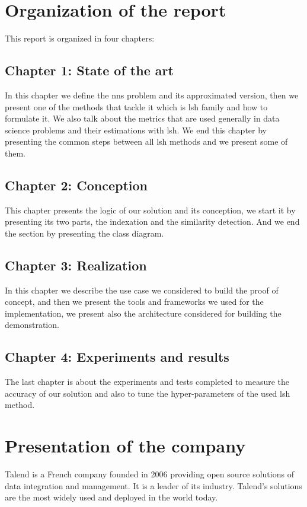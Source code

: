 \section*{Organization of the report}

This report is organized in four chapters:

\subsection*{Chapter 1: State of the art}
In this chapter we define the \acrfull{nns} problem and its approximated
version, then we present one of the methods that tackle it which is
\acrfull{lsh} family and how to formulate it. We also talk about the metrics
that are used generally in data science problems and their estimations with
\acrshort{lsh}. We end this chapter by presenting the common steps between all
\acrshort{lsh} methods and we present some of them.

\subsection*{Chapter 2: Conception}
This chapter presents the logic of our solution and its conception, we start it
by presenting its two parts, the indexation and the similarity detection. And we
end the section by presenting the class diagram.


\subsection*{Chapter 3: Realization}
In this chapter we describe the use case we considered to build the proof of
concept, and then we present the tools and frameworks we used for the
implementation, we present also the architecture considered for building the
demonstration.

\subsection*{Chapter 4: Experiments and results}
The last chapter is about the experiments and tests completed to measure the
accuracy of our solution and also to tune the hyper-parameters of the used
\acrfull{lsh} method. 


\section*{Presentation of the company}
Talend is a French company founded in 2006 providing open source solutions of
data integration and management. It is a leader of its industry. Talend's
solutions are the most widely used and deployed in the world today.

